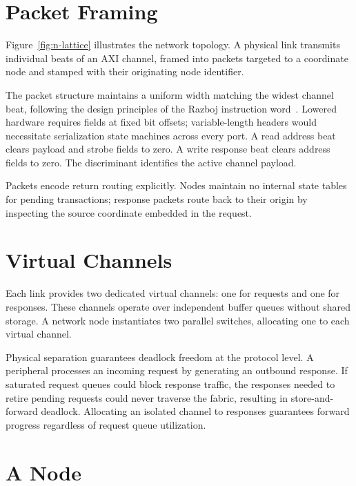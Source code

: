 \documentclass[journal,9pt]{IEEEtran}
\newcommand{\nocpart}[4]{%
}
\begin{document}
\section{Packet Framing}
\label{sec:n-pkt}

Figure~\ref{fig:n-lattice} illustrates the network topology. A physical link
transmits individual beats of an AXI channel, framed into packets targeted
to a coordinate node and stamped with their originating node identifier.

\nocpart{pkt.rs}{pkt}{Packet format definition.}{lst:n-pkt}

The packet structure maintains a uniform width matching the widest channel
beat, following the design principles of the Razboj instruction word~\cite{gpu}.
Lowered hardware requires fields at fixed bit offsets; variable-length headers
would necessitate serialization state machines across every port. A read
address beat clears payload and strobe fields to zero. A write response beat
clears address fields to zero. The  discriminant identifies the
active channel payload.

Packets encode return routing explicitly. Nodes maintain no internal state
tables for pending transactions; response packets route back to their origin
by inspecting the source coordinate embedded in the request.

\section{Virtual Channels}
\label{sec:n-vc}

Each link provides two dedicated virtual channels: one for requests and one
for responses. These channels operate over independent buffer queues without
shared storage. A network node instantiates two parallel switches, allocating
one to each virtual channel.

Physical separation guarantees deadlock freedom at the protocol level. A
peripheral processes an incoming request by generating an outbound response.
If saturated request queues could block response traffic, the responses
needed to retire pending requests could never traverse the fabric, resulting
in store-and-forward deadlock. Allocating an isolated channel to responses
guarantees forward progress regardless of request queue utilization.

\section{A Node}
\label{sec:n-node}
\end{document}
